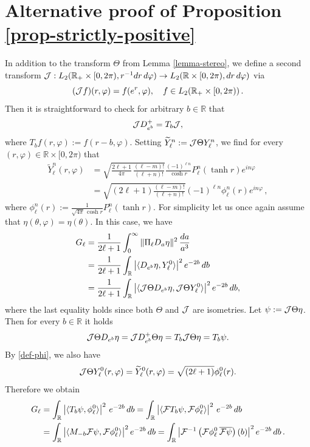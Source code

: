 \documentclass[a4paper,11pt,DIV=11,%
abstract=on%
]{scrartcl}
\def\R{{\mathbb R}}
\begin{document}
\section{Alternative proof of Proposition \ref{prop-strictly-positive}}
In addition to the transform $\Theta$ from Lemma \ref{lemma-stereo}, we define a second transform
	${\cal J}: L_2(\R_+\times[0,2\pi),r^{-1}dr\,d\varphi) \to L_2(\R\times[0,2\pi),dr\,d\varphi) $
	via
	\[
	({\cal J} f)(r,\varphi) = f(e^r , \varphi), \quad f\in L_2(\R_+\times[0,2\pi))\,.
	\]
	Then it is straightforward to check for arbitrary $b\in\R$ that
	$$ {\cal J} D_{e^b}^+ = T_b {\cal J},$$
	where $T_bf(r,\varphi) := f(r-b,\varphi)$.
	Setting $\widetilde{Y}_\ell^n := {\cal J}\Theta Y_\ell^n$, we find for every
	$(r,\varphi)\in \R\times [0,2\pi)$ that
	\begin{align}\label{def-phi}
		\widetilde{Y}_\ell^n (r,\varphi )
		&= \sqrt{ \frac{2\ell +1}{4\pi} \, \frac{(\ell-m)!}{(\ell + n)!} }
		\frac{(-1)^{\ell n}}{\cosh r}P_{\ell}^n(\tanh r) e^{in\varphi} \nonumber\\
		&= \sqrt{(2\ell + 1) \frac{(\ell-m)!}{(\ell + n)!} }
		(-1)^{\ell n} \phi_{\ell}^n (r) e^{in\varphi}\,,
	\end{align}
	where $\phi_{\ell}^n (r) := \frac{1}{\sqrt{{4\pi }}\, \cosh r}  P_{\ell}^n(\tanh r)$. 
		For simplicity let us once again assume that $\eta (\theta, \varphi) = \eta(\theta)$.
		In this case, we have
	\begin{align*}
		G_\ell
		&= \frac{1}{2\ell + 1} \int_{0}^\infty \| \Pi_\ell D_a \eta \|^2 \, \frac{da}{a^3}\\
		&= \frac{1}{2\ell + 1} \int_{\R}
		\left| \langle D_{e^b} \eta , Y_\ell^0 \rangle \right|^2 e^{-2b} \, db \\
		&= \frac{1}{2\ell + 1} \int_{\R}
		\left| \langle {\cal J}\Theta D_{e^b} \eta , {\cal J}\Theta Y_\ell^0 \rangle \right|^2
		e^{-2b} \, db,
	\end{align*}
	where the last equality holds since both $\Theta$ and $\cal J$ are isometries. 
	Let
	$\psi:= {\cal J}\Theta\eta$.
	Then for every $b\in\R$ it holds 
	$${\cal J} \Theta D_{e^b} \eta
	= {\cal J} D_{e^b}^+ \Theta \eta = T_b {\cal J} \Theta \eta = T_b \psi.$$
	By \eqref{def-phi}, we also have
	$${\cal J}\Theta Y_\ell^0 (r, \varphi)
	= \widetilde{Y}_\ell^0 (r,\varphi)=\sqrt{(2\ell + 1) } \phi_{\ell}^0 (r) .$$
	Therefore we obtain
	\begin{align*}
		G_\ell
		&= \int_{\R} \left| \langle T_b \psi , \phi_{\ell}^0 \rangle \right|^2 \, e^{-2b} \, db 
		= \int_{\R} \left| \langle {\cal F}T_b \psi ,
		{\cal F}\phi_{\ell}^0 \rangle \right|^2 \, e^{-2b} \, db \\
		&= \int_{\R} \left| \langle  M_{-b}{\cal F} \psi ,
		{\cal F}\phi_{\ell}^0 \rangle \right|^2 e^{-2b} \, db 
		= \int_{\R} \left| {\cal F}^{-1}
		\left( {\cal F}\phi_{\ell}^0 \,\overline{{\cal F} \psi}\right)(b)\right|^2 e^{-2b} \,db\,.
	\end{align*}
\end{document}
